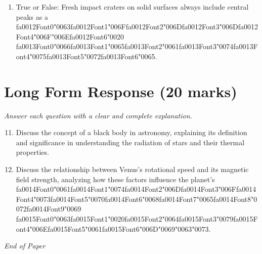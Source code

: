 \documentclass[12pt]{article}
\begin{document}
\begin{enumerate}[label=\arabic*.]
\item True or False: Fresh impact craters on solid surfaces always include central peaks as a {\csname fa0012Font0\endcsname\char"0063}{\csname fa0012Font1\endcsname\char"006F}{\csname fa0012Font2\endcsname\char"006D}{\csname fa0012Font3\endcsname\char"006D}{\csname fa0012Font4\endcsname\char"006F}{\char"006E}{\csname fa0012Font6\endcsname\char"0020} {\csname fa0013Font0\endcsname\char"0066}{\csname fa0013Font1\endcsname\char"0065}{\csname fa0013Font2\endcsname\char"0061}{\csname fa0013Font3\endcsname\char"0074}{\csname fa0013Font4\endcsname\char"0075}{\csname fa0013Font5\endcsname\char"0072}{\csname fa0013Font6\endcsname\char"0065}.
\end{enumerate}

\section*{Long Form Response (20 marks)}
\textit{Answer each question with a clear and complete explanation.}
\begin{enumerate}[label=\arabic*.]
\setcounter{enumi}{10}
\item Discuss the concept of a black body in astronomy, explaining its definition and
significance in understanding the radiation of stars and their thermal properties.
\item Discuss the relationship between Venus's rotational speed and its magnetic field strength,
analyzing how these factors influence the planet's {\csname fa0014Font0\endcsname\char"0061}{\csname fa0014Font1\endcsname\char"0074}{\csname fa0014Font2\endcsname\char"006D}{\csname fa0014Font3\endcsname\char"006F}{\csname fa0014Font4\endcsname\char"0073}{\csname fa0014Font5\endcsname\char"0070}{\csname fa0014Font6\endcsname\char"0068}{\csname fa0014Font7\endcsname\char"0065}{\csname fa0014Font8\endcsname\char"0072}{\csname fa0014Font9\endcsname\char"0069} {\csname fa0015Font0\endcsname\char"0063}{\csname fa0015Font1\endcsname\char"0020}{\csname fa0015Font2\endcsname\char"0064}{\csname fa0015Font3\endcsname\char"0079}{\csname fa0015Font4\endcsname\char"006E}{\csname fa0015Font5\endcsname\char"0061}{\csname fa0015Font6\endcsname\char"006D}{\char"0069}{\char"0063}{\char"0073}.
\end{enumerate}

\vfill
\noindent\textit{End of Paper}
\end{document}
